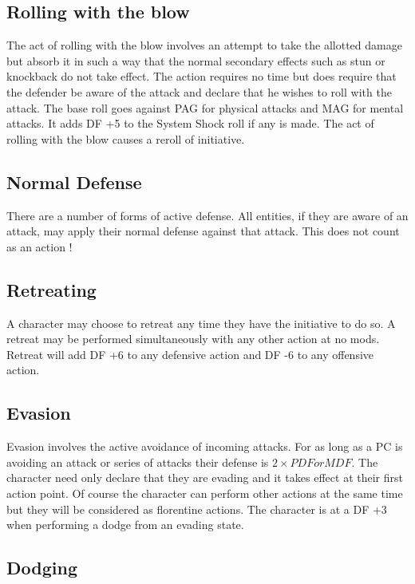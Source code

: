 \subsection{Rolling with the blow}

The act of rolling with the blow involves an attempt to take the 
allotted damage but absorb it in such a way that the normal secondary 
effects such as stun or knockback do not take effect. The action 
requires no time but does require that the defender be aware of the 
attack and declare that he wishes to roll with the attack. The base 
roll goes against PAG for physical attacks and MAG for mental 
attacks. It adds DF +5 to the System Shock roll if any is made.
The act of rolling with the blow causes a reroll of initiative.

\subsection{Normal Defense}

There are a number of forms of active defense. All entities, if they
are aware of an attack, may apply their normal defense against that
attack. This does not count as an action ! 

\subsection{Retreating}

A character may choose to retreat any time they have the initiative to do so. 
A retreat may be performed simultaneously with any other action at no mods. 
Retreat will add DF +6 to any defensive action and DF -6 to any offensive action.

\subsection{Evasion}

Evasion involves the active avoidance of incoming attacks. For as long
as a PC is avoiding an attack or series of attacks their defense is \( 2
\times PDF or MDF \). The character need only declare that they are evading and it takes effect at
their first action point. Of course the character can perform other actions 
at the same time but they will be considered as florentine actions. The 
character is at a DF +3 when performing a dodge from an evading state.

\subsection{Dodging} 


